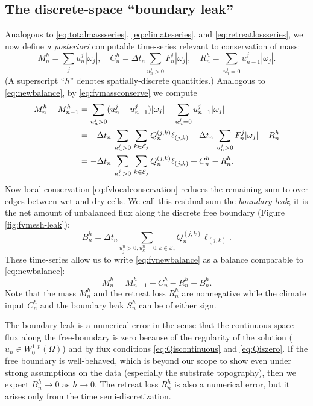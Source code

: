 \documentclass[final,onefignum]{siamart190516}
\begin{document}
\subsection{The discrete-space ``boundary leak''}  \label{subsec:leak}  Analogous to \eqref{eq:totalmassseries}, \eqref{eq:climateseries}, and \eqref{eq:retreatlossseries}, we now define \emph{a posteriori} computable time-series relevant to conservation of mass:
\begin{equation}
M_n^h = \sum_j u_n^j |\omega_j|, \quad C_n^h = \Delta t_n\!\!\sum_{u_n^j>0} F_n^j |\omega_j|, \quad R_n^h = \sum_{u_n^j=0} u_{n-1}^j |\omega_j|.  \label{eq:fvtimeseriesdefn}
\end{equation}
(A superscript ``$h$'' denotes spatially-discrete quantities.)  Analogous to \eqref{eq:newbalance}, by \eqref{eq:fvmassconserve} we compute
\begin{align}
M_n^h - M_{n-1}^h &= \sum_{u_n^j>0} (u_n^j - u_{n-1}^j) |\omega_j| - \sum_{u_n^j=0} u_{n-1}^j |\omega_j| \notag \\
   &= - \Delta t_n\,\sum_{u_n^j>0}\, \sum_{k\in\mathcal{E}_j} Q_n^{(j,k)} \ell_{(j,k)} + \Delta t_n\,\sum_{u_n^j>0} F_n^j |\omega_j| - R_n^h \notag \\
   &= - \Delta t_n\,\sum_{u_n^j>0}\, \sum_{k\in\mathcal{E}_j} Q_n^{(j,k)} \ell_{(j,k)} + C_n^h - R_n^h.  \label{eq:fvnewbalance}
\end{align}
Now local conservation \eqref{eq:fvlocalconservation} reduces the remaining sum to over edges between wet and dry cells.  We call this residual sum the \emph{boundary leak}; it is the net amount of unbalanced flux along the discrete free boundary (Figure \ref{fig:fvmesh-leak}):
\begin{equation}
B_n^h = \Delta t_n \sum_{u_j^n > 0, u_k^n = 0, k\in\mathcal{E}_j} Q_n^{(j,k)} \ell_{(j,k)}. \label{eq:fvdefineleak}
\end{equation}
These time-series allow us to write \eqref{eq:fvnewbalance} as a balance comparable to \eqref{eq:newbalance}:
\begin{equation}
  M_n^h = M_{n-1}^h + C_n^h - R_n^h - B_n^h. \label{eq:fvfinalbalance}
\end{equation}
Note that the mass $M_n^h$ and the retreat loss $R_n^h$ are nonnegative while the climate input $C_n^h$ and the boundary leak $S_n^h$ can be of either sign.

The boundary leak is a numerical error in the sense that the continuous-space flux along the free-boundary is zero because of the regularity of the solution ($u_n \in W_0^{1,p}(\Omega)$) and by flux conditions \eqref{eq:Qiscontinuous} and \eqref{eq:Qiszero}.  If the free boundary is well-behaved, which is beyond our scope to show even under strong assumptions on the data (especially the substrate topography), then we expect $B_n^h\to 0$ as $h\to 0$.  The retreat loss $R_n^h$ is also a numerical error, but it arises only from the time semi-discretization.
\end{document}
